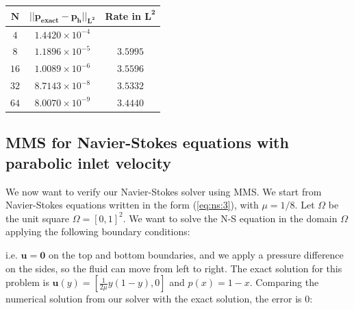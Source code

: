 \documentclass[a4paper,11pt,openright,twoside]{book}
\begin{document}
\begin{center}
\begin{tabular}{| c | c | c |}
\hline
$\mathbf{N}$ & $\mathbf{|| p_{exact} - p_h ||_{L^2}}$ & \textbf{Rate in } $  \mathbf{L^2}$  \\
\hline
$ 4 $ & $1.4420  \times 10^{-4} $ & \\
\hline
$ 8 $ & $ 1.1896  \times 10^{-5} $ & $3.5995$ \\
\hline
$ 16 $ & $ 1.0089  \times 10^{-6} $ & $3.5596$ \\
\hline
$ 32 $ & $  8.7143 \times 10^{-8} $ & $3.5332$ \\
\hline
$ 64 $ & $ 8.0070 \times 10^{-9} $ & $3.4440$ \\
\hline
\end{tabular}
\end{center}


\subsection{MMS for Navier-Stokes equations with parabolic inlet velocity}
\label{parabolic inlet}
We now want to verify our Navier-Stokes solver using MMS. We start from Navier-Stokes equations written in the form (\ref{eq:ns:3}), with $\mu = 1/8$.  Let $\Omega$ be the unit square $\Omega = [0,1]^2$. We want to solve the N-S equation in the domain $\Omega$ applying the following boundary conditions:

\begin{center}
\end{center}

i.e. $\mathbf{u=0}$ on the top and bottom boundaries, and we apply a pressure difference on the sides, so the fluid can move from left to right. The exact solution for this problem is $\mathbf{u}(y) = [\frac{1}{2\mu} y (1-y), 0]$ and $p(x) = 1-x$. Comparing the numerical solution from our solver with the exact solution, the error is 0:
\end{document}
